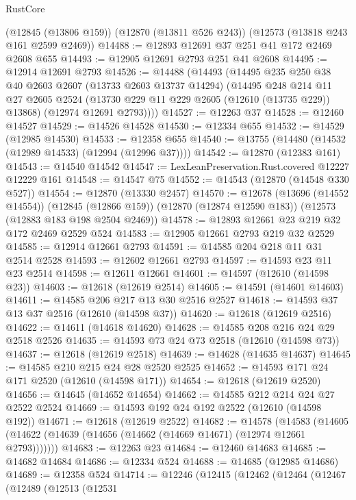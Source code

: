 \begin{lexlean}{RustCore}
\begin{coremodule}
    (@12845 (@13806 @159))
    (@12870 (@13811 @526 @243))
    (@12573 (@13818 @243 @161 @2599 @2469))
@14488 := @12893 @12691 @37 @251 @41 @172 @2469 @2608 @655
@14493 := @12905 @12691 @2793 @251 @41 @2608
@14495 := @12914 @12691 @2793
@14526 := @14488
    (@14493
      (@14495
        @235
        @250
        @38
        @40
        @2603
        @2607
        (@13733 @2603 @13737 @14294)
        (@14495
          @248
          @214
          @11
          @27
          @2605
          @2524
          (@13730 @229 @11 @229 @2605 (@12610 (@13735 @229)) @13868)
          (@12974 @12691 @2793))))
@14527 := @12263 @37
@14528 := @12460 @14527
@14529 := @14526 @14528
@14530 := @12334 @655
@14532 := @14529 (@12985 @14530)
@14533 := @12358 @655
@14540 := @13755 (@14480 (@14532 (@12989 @14533) (@12994 (@12996 @37))))
@14542 := @12870 (@12383 @161)
@14543 := @14540 @14542
@14547 := LexLeanPreservation.Rust.covered @12227 @12229 @161
@14548 := @14547 @75
@14552 := @14543 (@12870 (@14548 @330 @527))
@14554 := @12870 (@13330 @2457)
@14570 := @12678
    (@13696 (@14552 @14554))
    (@12845 (@12866 @159))
    (@12870 (@12874 @12590 @183))
    (@12573 (@12883 @183 @198 @2504 @2469))
@14578 := @12893 @12661 @23 @219 @32 @172 @2469 @2529 @524
@14583 := @12905 @12661 @2793 @219 @32 @2529
@14585 := @12914 @12661 @2793
@14591 := @14585 @204 @218 @11 @31 @2514 @2528
@14593 := @12602 @12661 @2793
@14597 := @14593 @23 @11 @23 @2514
@14598 := @12611 @12661
@14601 := @14597 (@12610 (@14598 @23))
@14603 := @12618 (@12619 @2514)
@14605 := @14591 (@14601 @14603)
@14611 := @14585 @206 @217 @13 @30 @2516 @2527
@14618 := @14593 @37 @13 @37 @2516 (@12610 (@14598 @37))
@14620 := @12618 (@12619 @2516)
@14622 := @14611 (@14618 @14620)
@14628 := @14585 @208 @216 @24 @29 @2518 @2526
@14635 := @14593 @73 @24 @73 @2518 (@12610 (@14598 @73))
@14637 := @12618 (@12619 @2518)
@14639 := @14628 (@14635 @14637)
@14645 := @14585 @210 @215 @24 @28 @2520 @2525
@14652 := @14593 @171 @24 @171 @2520 (@12610 (@14598 @171))
@14654 := @12618 (@12619 @2520)
@14656 := @14645 (@14652 @14654)
@14662 := @14585 @212 @214 @24 @27 @2522 @2524
@14669 := @14593 @192 @24 @192 @2522 (@12610 (@14598 @192))
@14671 := @12618 (@12619 @2522)
@14682 := @14578
    (@14583 (@14605 (@14622 (@14639 (@14656 (@14662 (@14669 @14671) (@12974 @12661 @2793)))))))
@14683 := @12263 @23
@14684 := @12460 @14683
@14685 := @14682 @14684
@14686 := @12334 @524
@14688 := @14685 (@12985 @14686)
@14689 := @12358 @524
@14714 := @12246
    (@12415
      (@12462
        (@12464
          (@12467
            (@12489
              (@12513
                (@12531

\end{coremodule}
\end{lexlean}
